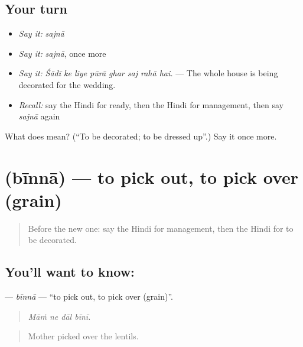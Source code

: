 \subsection*{Your turn}
\begin{itemize}
\raggedright
  \item \emph{Say it:} \emph{sajnā}
  \item \emph{Say it:} \emph{sajnā}, once more
  \item \emph{Say it:} \emph{Śādī ke liye pūrā ghar saj rahā hai.} — The whole house is being decorated for the wedding.
  \item \emph{Recall:} say the Hindi for ready, then the Hindi for management, then say \emph{sajnā} again
\end{itemize}

\begin{tcolorbox}[breakable,colback=teal!4,colframe=teal!35!black,title={Before you move on}]
What does  mean? (\textquotedblleft{}To be decorated; to be dressed up\textquotedblright{}.) Say it once more.
\end{tcolorbox}
\section[\texorpdfstring{\hi{बीनना} (bīnnā)}{बीनना (bīnnā)}]{ (bīnnā) — to pick out, to pick over (grain)}

\label{lesson:HI-C538-binna}



\begin{quote}
Before the new one: say the Hindi for management, then the Hindi for to be decorated.
\end{quote}

\subsection*{You'll want to know: }
\textbf{} — \emph{bīnnā} — \textquotedblleft{}to pick out, to pick over (grain)\textquotedblright{}.

\begin{quote}
   
\end{quote}

\begin{quote}
\emph{Māṁ ne dāl bīnī.}
\end{quote}

\begin{quote}
Mother picked over the lentils.
\end{quote}

